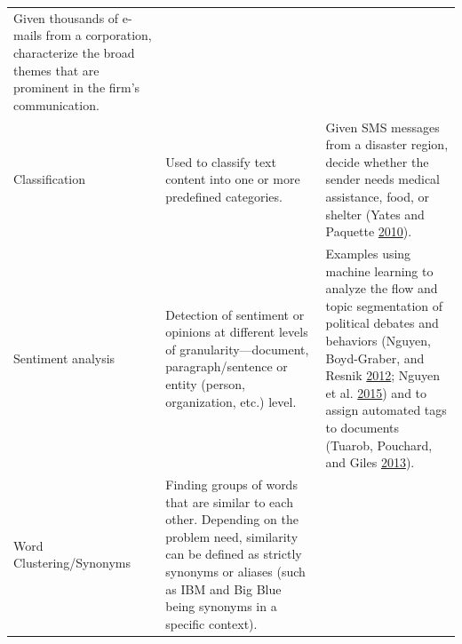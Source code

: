 \documentclass[]{krantz}
\begin{document}
\begin{longtable}[]{@{}lll@{}}
\begin{minipage}[t]{0.63\columnwidth}
Given thousands of e-mails from a corporation, characterize the broad
themes that are prominent in the firm's communication.\strut
\end{minipage}\tabularnewline
\begin{minipage}[t]{0.12\columnwidth}\raggedright\strut
Classification\strut
\end{minipage} & \begin{minipage}[t]{0.16\columnwidth}\raggedright\strut
Used to classify text content into one or more predefined
categories.\strut
\end{minipage} & \begin{minipage}[t]{0.63\columnwidth}\raggedright\strut
Given SMS messages from a disaster region, decide whether the sender
needs medical assistance, food, or shelter (Yates and Paquette
\protect\hyperlink{ref-yates-10}{2010}).\strut
\end{minipage}\tabularnewline
\begin{minipage}[t]{0.12\columnwidth}\raggedright\strut
Sentiment analysis\strut
\end{minipage} & \begin{minipage}[t]{0.16\columnwidth}\raggedright\strut
Detection of sentiment or opinions at different levels of
granularity---document, paragraph/sentence or entity (person,
organization, etc.) level.\strut
\end{minipage} & \begin{minipage}[t]{0.63\columnwidth}\raggedright\strut
Examples using machine learning to analyze the flow and topic
segmentation of political debates and behaviors (Nguyen, Boyd-Graber,
and Resnik \protect\hyperlink{ref-nguyen-12}{2012}; Nguyen et al.
\protect\hyperlink{ref-Nguyen:Boyd-Graber:Resnik:Miler-2015}{2015}) and
to assign automated tags to documents (Tuarob, Pouchard, and Giles
\protect\hyperlink{ref-tuarob-13}{2013}).\strut
\end{minipage}\tabularnewline
\begin{minipage}[t]{0.12\columnwidth}\raggedright\strut
Word Clustering/Synonyms\strut
\end{minipage} & \begin{minipage}[t]{0.16\columnwidth}\raggedright\strut
Finding groups of words that are similar to each other. Depending on the
problem need, similarity can be defined as strictly synonyms or aliases
(such as IBM and Big Blue being synonyms in a specific context).\strut
\end{minipage} & \begin{minipage}[t]{0.63\columnwidth}\raggedright\strut

\end{minipage}
\end{longtable}
\end{document}

